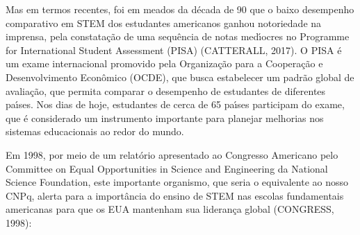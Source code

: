 \documentclass[
12pt,		%
openright,	%
twoside,  %
a4paper,			%
chapter=TITLE,		%
english,			%
french,				%
spanish,			%
brazil				%
]{USPSC-classe/USPSC}
\begin{document}
\noindent\begin{center}\mbox{\centering{}}\end{center}


Mas em termos recentes, foi em meados da d\'ecada de 90 que o baixo desempenho comparativo em STEM dos estudantes americanos ganhou notoriedade na imprensa, pela constata\c{c}\~ao de uma sequ\^encia de notas med\'{\i}ocres no Programme for International Student Assessment (PISA)  (CATTERALL, 2017). O PISA \'e um exame internacional promovido pela Organiza\c{c}\~ao para a Coopera\c{c}\~ao e Desenvolvimento Econ\^omico (OCDE), que busca estabelecer um padr\~ao global de avalia\c{c}\~ao, que permita comparar o desempenho de estudantes de diferentes pa\'{\i}ses. Nos dias de hoje, estudantes de cerca de 65 pa\'{\i}ses participam do exame, que \'e considerado um instrumento importante para planejar melhorias nos sistemas educacionais ao redor do mundo.









Em 1998, por meio de um relat\'orio apresentado ao Congresso Americano pelo Committee on Equal Opportunities in Science and Engineering da National Science Foundation, este importante organismo, que seria o equivalente ao nosso CNPq, alerta para a import\^ancia do ensino de STEM nas escolas fundamentais americanas para que os EUA mantenham sua lideran\c{c}a global  (CONGRESS, 1998):










\noindent\begin{center}\mbox{\centering{}}\end{center}
\end{document}
